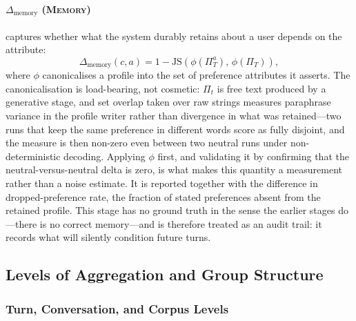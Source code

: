 \documentclass[manuscript,screen,review]{acmart}
\newcommand{\Dmemory}{\Delta_{\mathrm{memory}}}
\newcommand{\JS}{\mathrm{JS}}
\newcommand{\stage}[1]{\textsc{#1}}
\begin{document}
\paragraph{$\Dmemory$ (\stage{Memory})}
captures whether what the system durably retains about a user depends on the
attribute:
\begin{equation}
  \Dmemory(c, a) = 1 - \JS\!\left(\phi(\Pi^{a}_T),\, \phi(\Pi_T)\right),
  \label{eq:dmemory}
\end{equation}
where $\phi$ canonicalises a profile into the set of preference attributes it
asserts. The canonicalisation is load-bearing, not cosmetic: $\Pi_t$ is free text
produced by a generative stage, and set overlap taken over raw strings measures
paraphrase variance in the profile writer rather than divergence in what was
retained---two runs that keep the same preference in different words score as
fully disjoint, and the measure is then non-zero even between two neutral runs
under non-deterministic decoding. Applying $\phi$ first, and validating it by
confirming that the neutral-versus-neutral delta is zero, is what makes this
quantity a measurement rather than a noise estimate. It is
reported together with the difference in dropped-preference rate, the fraction of
stated preferences absent from the retained profile. This stage has no ground
truth in the sense the earlier stages do---there is no correct memory---and is
therefore treated as an audit trail: it records what will silently condition
future turns.

\subsection{Levels of Aggregation and Group Structure}
\label{sec:aggregation}

\subsubsection{Turn, Conversation, and Corpus Levels}
\label{sec:levels}
\end{document}
